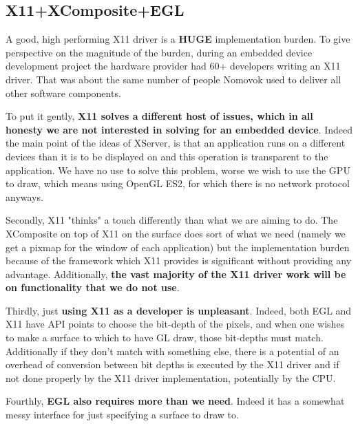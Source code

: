 \documentclass[a4paper,11pt]{article}
\begin{document}
\subsection{X11+XComposite+EGL}
\begin{indenter}{2cm}

A good, high performing X11 driver is a \textbf{HUGE} implementation burden.
To give perspective on the magnitude of the burden, during an embedded device development
project the hardware provider had 60+ developers writing an X11 driver. That was about the same number
of people Nomovok used to deliver all other software components.

To put it gently, \textbf{X11 solves a different host of issues, which in all
honesty we are not interested in solving for an embedded device}. Indeed
the main point of the ideas of XServer, is that an application runs on
a different devices than it is to be displayed on and this operation is
transparent to the application. We have no use to solve this problem,
worse we wish to use the GPU to draw, which means using OpenGL ES2, for
which there is no network protocol anyways.

Secondly, X11 "thinks" a touch differently than what we are aiming to do.
The XComposite on top of X11 on the surface does sort of what we need
(namely we get a pixmap for the window of each application) but the
implementation burden because of the framework which X11
provides is significant without providing any advantage. Additionally,
\textbf{the vast majority of the X11 driver work will be on functionality
that we do not use}.

Thirdly, just \textbf{using X11 as a developer is unpleasant}. Indeed, both
EGL and X11 have API points to choose the bit-depth of the pixels,
and when one wishes to make a surface to which to have GL draw, those
bit-depths must match. Additionally if they don't match with something
else, there is a potential of an overhead of conversion between bit
depths is executed by the X11 driver and if not done properly by the X11
driver implementation, potentially by the CPU.

Fourthly, \textbf{EGL also requires more than we need}. Indeed it has a somewhat
messy interface for just specifying a surface to draw to.

\end{indenter}
\end{document}

